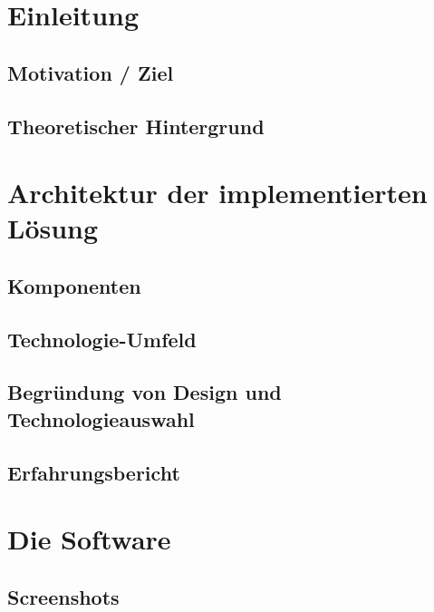 \documentclass[a4paper]{thesis}
\begin{document}

\tableofcontents
\newpage

\section{Einleitung}

\subsection{Motivation / Ziel}

\subsection{Theoretischer Hintergrund}

\section{Architektur der implementierten Lösung}

\subsection{Komponenten}

\subsection{Technologie-Umfeld}

\subsection{Begründung von Design und Technologieauswahl}

\subsection{Erfahrungsbericht}

\section{Die Software}

\subsection{Screenshots}
\end{document}
